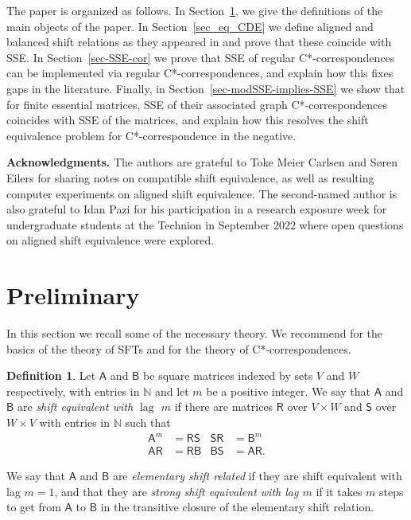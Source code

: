 \documentclass[11pt, letterpaper,final]{amsart}
\newcommand{\bbN}{{\mathbb{N}}}
\newcommand{\lag}{\operatorname{lag}}
\theoremstyle{definition}
\newtheorem{dfn}[thm]{Definition}
\begin{document}
 
The paper is organized as follows. In Section~\ref{sec_prelim}, we give the definitions of the main objects of the paper. In Section~\ref{sec_eq_CDE} we define aligned and balanced shift relations as they appeared in \cite{CDE} and prove that these coincide with SSE. In Section~\ref{sec-SSE-cor} we prove that SSE of regular C*-correspondences can be implemented via regular C*-correspondences, and explain how this fixes gaps in the literature. Finally, in Section~\ref{sec-modSSE-implies-SSE} we show that for finite essential matrices, SSE of their associated graph C*-correspondences coincides with SSE of the matrices, and explain how this resolves the shift equivalence problem for C*-correspondence in the negative.

\vspace{6pt}

\textbf{Acknowledgments.}
The authors are grateful to Toke Meier Carlsen and S\o ren Eilers for sharing notes on compatible shift equivalence, as well as resulting computer experiments on aligned shift equivalence. The second-named author is also grateful to Idan Pazi for his participation in a research exposure week for undergraduate students at the Technion in September 2022 where open questions on aligned shift equivalence were explored.
 
\section{Preliminary}\label{sec_prelim}

In this section we recall some of the necessary theory. We recommend \cite{LM95} for the basics of the theory of SFTs and \cite{Lan95} for the theory of C*-correspondences. 

\begin{dfn}
Let $\mathsf{A}$ and $\mathsf{B}$ be square matrices indexed by sets $V$ and $W$ respectively, with entries in $\bbN$ and let $m$ be a positive integer.  We say that $\mathsf{A}$ and $\mathsf{B}$ are \emph{shift equivalent with $\lag$ $m$} if there are matrices $\mathsf{R}$ over $V \times W$ and $\mathsf{S}$ over $W\times V$ with entries in $\bbN$ such that 
\begin{align*}
\mathsf{A}^m &= \mathsf{R}\mathsf{S}  & \mathsf{S}\mathsf{R} &= \mathsf{B}^m \\
\mathsf{A}\mathsf{R} &=\mathsf{R}\mathsf{B} & \mathsf{B}\mathsf{S} &= \mathsf{A}\mathsf{R}.
\end{align*}

We say that $\mathsf{A}$ and $\mathsf{B}$ are \emph{elementary shift related} if they are shift equivalent with lag $m=1$, and that they are \emph{strong shift equivalent with lag $m$} if it takes $m$ steps to get from $\mathsf{A}$ to $\mathsf{B}$ in the transitive closure of the elementary shift relation.
\end{dfn}
\end{document}

